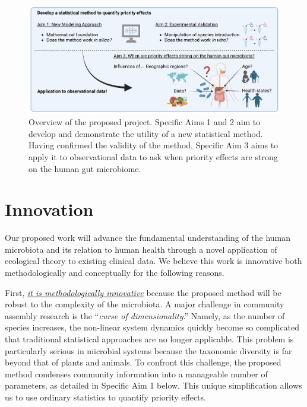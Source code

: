\documentclass[12pt, class=article, crop=false]{standalone}
\begin{document}
\begin{figure}
    \flushleft
    \includegraphics[scale=0.65]{output/figure_overview.pdf}
    \caption{Overview of the proposed project. Specific Aims 1 and 2 aim to develop and demonstrate the utility of a new statistical method. Having confirmed the validity of the method, Specific Aim 3 aims to apply it to observational data to ask when priority effects are strong on the human gut microbiome.}
    \label{fig:overview}
\end{figure}

\section{Innovation}
Our proposed work will advance the fundamental understanding of the human microbiota and its relation to human health through a novel application of ecological theory to existing clinical data.
We believe this work is innovative both methodologically and conceptually for the following reasons.

First, \ul{\emph{it is methodologically innovative}} because the proposed method will be robust to the complexity of the microbiota.
A major challenge in community assembly research is the ``\textit{curse of dimensionality}.''
Namely, as the number of species increases, the non-linear system dynamics quickly become so complicated that traditional statistical approaches are no longer applicable.
This problem is particularly serious in microbial systems because the taxonomic diversity is far beyond that of plants and animals.
To confront this challenge, the proposed method condenses community information into a manageable number of parameters, as detailed in Specific Aim 1 below. 
This unique simplification allows us to use ordinary statistics to quantify priority effects.
\end{document}
